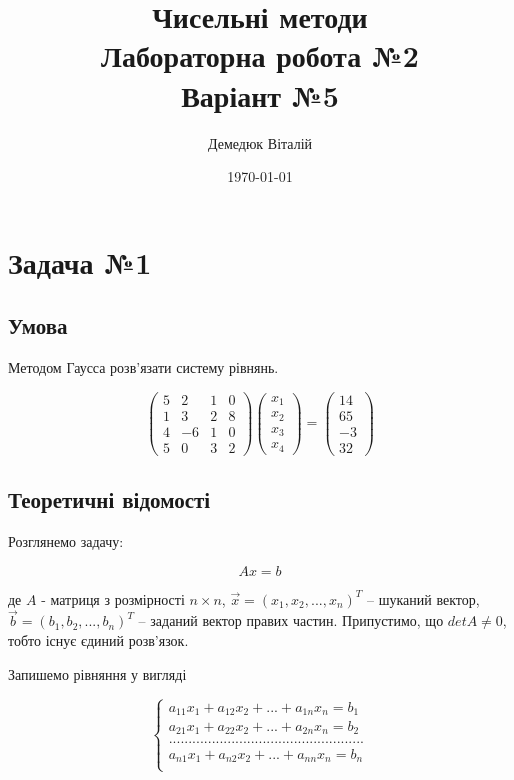 \documentclass[a4paper, 12pt]{article}
\author{Демедюк Віталій}
\title{Чисельні методи\\
	   Лабораторна робота №2\\
	   Варіант №5}
\date{\today}
\begin{document}
\maketitle

\newpage
\tableofcontents

\newpage
\section{Задача №1}

\subsection{Умова}

Методом Гаусса розв’язати систему рівнянь.

\[
\begin{pmatrix}
5 & 2 & 1 & 0\\
1 & 3 & 2 & 8\\
4 & -6 & 1 & 0\\
5 & 0 & 3 & 2
\end{pmatrix}
\begin{pmatrix}
x_1\\
x_2\\
x_3\\
x_4
\end{pmatrix}
=
\begin{pmatrix}
14\\
65\\
-3\\
32
\end{pmatrix}
\]

\subsection{Теоретичні відомості}

Розглянемо задачу:

\[ Ax = b \]

де $A$ - матриця з розмірності $n \times n$, $\vec{x} = (x_1, x_2, ..., x_n)^T$ -- шуканий вектор, $\vec{b} = (b_1, b_2, ..., b_n)^T$ -- заданий вектор правих частин. Припустимо, що $detA \neq 0$, тобто існує єдиний розв'язок.

Запишемо рівняння у вигляді

\[\begin{cases}
a_{11}x_1 + a_{12}x_2 + ... + a_{1n}x_n = b_1\\
a_{21}x_1 + a_{22}x_2 + ... + a_{2n}x_n = b_2\\
..................................................\\
a_{n1}x_1 + a_{n2}x_2 + ... + a_{nn}x_n = b_n\\
\end{cases}\]
\end{document}
